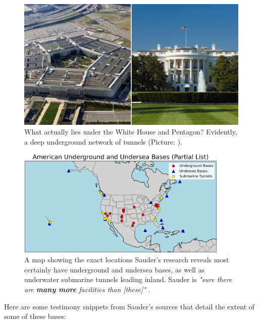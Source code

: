 \documentclass[10pt,twocolumn,letterpaper]{article}
\begin{document}
\begin{figure}[b]
\begin{center}
   \includegraphics[width=1\linewidth]{penta.jpg}
\end{center}
   \caption{What actually lies under the White House and Pentagon? Evidently, a deep underground network of tunnels (Picture: \cite{31}).}
\label{fig:3}
\label{fig:onecol}
\end{figure}


\begin{figure}[t]
\begin{center}
\includegraphics[width=0.9\textwidth]{basescrop.png}
\end{center}
   \caption{A map showing the exact locations Sauder's research reveals most certainly have underground and undersea bases, as well as underwater submarine tunnels leading inland. Sauder is \textit{"sure there are \textbf{many more} facilities than [these]"} \cite{22}.}
   \label{fig:4}
\end{figure}

Here are some testimony snippets from Sauder's sources that detail the extent of some of these bases:
\end{document}

